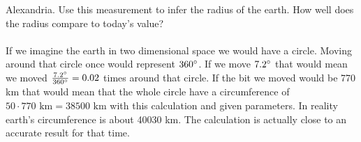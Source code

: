 Alexandria. Use this measurement to infer the radius of the earth. How well does the radius compare to
today's value?\\
\\
If we imagine the earth in two dimensional space we would have a circle. Moving around that circle once
would represent $360 \degree$. If we move $7.2 \degree$ that would mean we moved 
$\frac{7.2 \degree}{360 \degree} = 0.02$ times around that circle. If the bit we moved would be 770 km
that would mean that the whole circle have a circumference of 
$50 \cdot 770 \text{ km} = 38500 \text{ km}$ with this calculation and given parameters. In reality
earth's circumference is about 40030 km. The calculation is actually close to an accurate result for that 
time.
